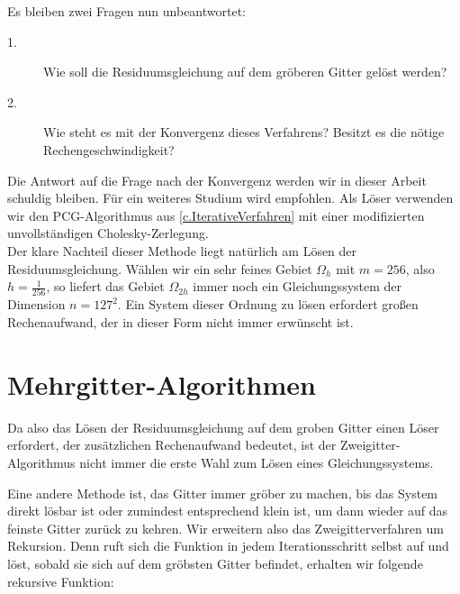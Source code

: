 Es bleiben zwei Fragen nun unbeantwortet:
\begin{description}
\item[1.] Wie soll die Residuumsgleichung auf dem gröberen Gitter gelöst werden?
\item[2.] Wie steht es mit der Konvergenz dieses Verfahrens? Besitzt es die nötige Rechengeschwindigkeit?
\end{description}

Die Antwort auf die Frage nach der Konvergenz werden wir in dieser Arbeit schuldig bleiben. Für ein weiteres Studium wird \cite{SAAD8} empfohlen.
Als Löser verwenden wir den PCG-Algorithmus aus \autoref{c.IterativeVerfahren} mit einer modifizierten unvollständigen Cholesky-Zerlegung.\\

Der klare Nachteil dieser Methode liegt natürlich am Lösen der Residuumsgleichung. Wählen wir ein sehr feines Gebiet $\Omega_{h}$ mit $m = 256$, also $h = \frac {1} {256}$, so liefert das Gebiet $\Omega_{2h}$ immer noch ein Gleichungssystem der Dimension $n = 127^{2}$. Ein System dieser Ordnung zu lösen erfordert großen Rechenaufwand, der in dieser Form nicht immer erwünscht ist. \\

\section{Mehrgitter-Algorithmen}\label{s.Mehrgitteralgorithmus}

Da also das Lösen der Residuumsgleichung auf dem groben Gitter einen Löser erfordert, der zusätzlichen Rechenaufwand bedeutet, ist der Zweigitter-Algorithmus nicht immer die erste Wahl zum Lösen eines Gleichungssystems.

Eine andere Methode ist, das Gitter immer gröber zu machen, bis das System direkt lösbar ist oder zumindest entsprechend klein ist, um dann wieder auf das feinste Gitter zurück zu kehren. Wir erweitern also das Zweigitterverfahren um Rekursion. Denn ruft sich die Funktion in jedem Iterationsschritt selbst auf und löst, sobald sie sich auf dem gröbsten Gitter befindet, erhalten wir folgende rekursive Funktion:

